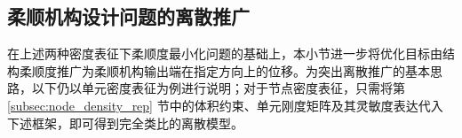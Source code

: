 


\subsection{柔顺机构设计问题的离散推广}
\label{subsec:compl_mech_design}

在上述两种密度表征下柔顺度最小化问题的基础上，本小节进一步将优化目标由结构柔顺度推广为柔顺机构输出端在指定方向上的位移。为突出离散推广的基本思路，以下仍以单元密度表征为例进行说明；对于节点密度表征，只需将第 \ref{subsec:node_density_rep} 节中的体积约束、单元刚度矩阵及其灵敏度表达代入下述框架，即可得到完全类比的离散模型。

